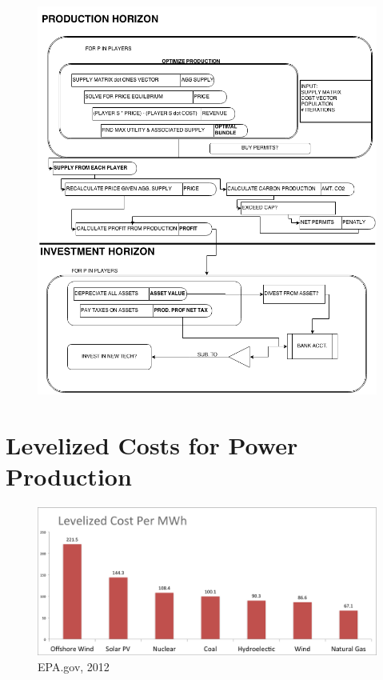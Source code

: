 \documentclass[12pt]{article}
\begin{document}
		\begin{figure}[ht!]
			\begin{center}
			\includegraphics[scale = .5]{wire.png}
			\end{center}
		\end{figure}

\newpage

	\section{Levelized Costs for Power Production}

	\begin{figure}[ht!]
		\begin{center}
		\includegraphics[scale = .5, angle=90]{levelized_cost.png}
		\caption{EPA.gov, 2012 \cite{CO2_Breakdown}}
		\end{center}
		\label{levelized}
	\end{figure}
\end{document}
